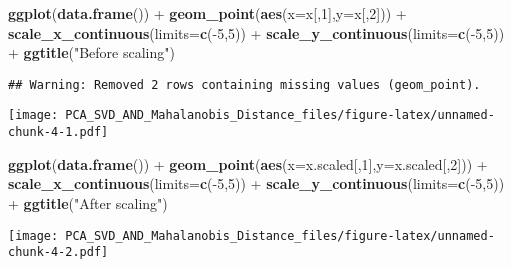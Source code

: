 \documentclass[]{article}
\newenvironment{Shaded}{\begin{snugshade}}{\end{snugshade}}
\newcommand{\KeywordTok}[1]{\textcolor[rgb]{0.13,0.29,0.53}{\textbf{{#1}}}}
\newcommand{\DataTypeTok}[1]{\textcolor[rgb]{0.13,0.29,0.53}{{#1}}}
\newcommand{\DecValTok}[1]{\textcolor[rgb]{0.00,0.00,0.81}{{#1}}}
\newcommand{\StringTok}[1]{\textcolor[rgb]{0.31,0.60,0.02}{{#1}}}
\newcommand{\NormalTok}[1]{{#1}}
\begin{document}
\begin{Shaded}
\begin{Highlighting}[]
\KeywordTok{ggplot}\NormalTok{(}\KeywordTok{data.frame}\NormalTok{()) +}\StringTok{ }\KeywordTok{geom_point}\NormalTok{(}\KeywordTok{aes}\NormalTok{(}\DataTypeTok{x=}\NormalTok{x[,}\DecValTok{1}\NormalTok{],}\DataTypeTok{y=}\NormalTok{x[,}\DecValTok{2}\NormalTok{])) +}\StringTok{ }\KeywordTok{scale_x_continuous}\NormalTok{(}\DataTypeTok{limits=}\KeywordTok{c}\NormalTok{(-}\DecValTok{5}\NormalTok{,}\DecValTok{5}\NormalTok{))  +}\StringTok{ }\KeywordTok{scale_y_continuous}\NormalTok{(}\DataTypeTok{limits=}\KeywordTok{c}\NormalTok{(-}\DecValTok{5}\NormalTok{,}\DecValTok{5}\NormalTok{)) +}\StringTok{ }\KeywordTok{ggtitle}\NormalTok{(}\StringTok{"Before scaling"}\NormalTok{)}
\end{Highlighting}
\end{Shaded}

\begin{verbatim}
## Warning: Removed 2 rows containing missing values (geom_point).
\end{verbatim}

\texttt{[image: PCA\_SVD\_AND\_Mahalanobis\_Distance\_files/figure-latex/unnamed-chunk-4-1.pdf]}

\begin{Shaded}
\begin{Highlighting}[]
\KeywordTok{ggplot}\NormalTok{(}\KeywordTok{data.frame}\NormalTok{()) +}\StringTok{ }\KeywordTok{geom_point}\NormalTok{(}\KeywordTok{aes}\NormalTok{(}\DataTypeTok{x=}\NormalTok{x.scaled[,}\DecValTok{1}\NormalTok{],}\DataTypeTok{y=}\NormalTok{x.scaled[,}\DecValTok{2}\NormalTok{])) +}\StringTok{ }\KeywordTok{scale_x_continuous}\NormalTok{(}\DataTypeTok{limits=}\KeywordTok{c}\NormalTok{(-}\DecValTok{5}\NormalTok{,}\DecValTok{5}\NormalTok{))  +}\StringTok{ }\KeywordTok{scale_y_continuous}\NormalTok{(}\DataTypeTok{limits=}\KeywordTok{c}\NormalTok{(-}\DecValTok{5}\NormalTok{,}\DecValTok{5}\NormalTok{)) +}\StringTok{ }\KeywordTok{ggtitle}\NormalTok{(}\StringTok{"After scaling"}\NormalTok{)}
\end{Highlighting}
\end{Shaded}

\texttt{[image: PCA\_SVD\_AND\_Mahalanobis\_Distance\_files/figure-latex/unnamed-chunk-4-2.pdf]}
\end{document}
